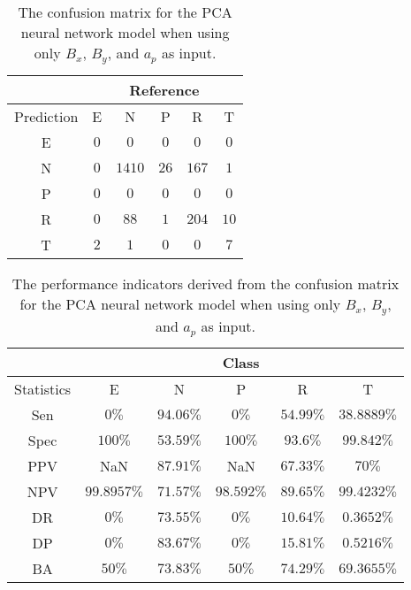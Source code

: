 \begin{table}[!ht]
	\centering
	\begin{tabular}{|c|c|c|c|c|c|}
		\hline
		 & \multicolumn{5}{|c|}{Reference} \\ \hline
		 Prediction & E & N & P & R & T \\ \hline
		 E & $0$ & $0$ & $0$ & $0$ & $0$ \\ \hline
		 N & $0$ & $1410$ & $26$ & $167$ & $1$ \\ \hline
		 P & $0$ & $0$ & $0$ & $0$ & $0$ \\ \hline
		 R & $0$ & $88$ & $1$ & $204$ & $10$ \\ \hline
		 T & $2$ & $1$ & $0$ & $0$ & $7$ \\ \hline
	\end{tabular}
	\caption{The confusion matrix for the PCA neural network model when using only $B_{x}$, $B_{y}$, and $a_{p}$ as input.}
	\label{tab:cm:xyap:pcaNNet}
\end{table}

\begin{table}[!ht]
	\centering
	\begin{tabular}{|c|c|c|c|c|c|}
		\hline
		 & \multicolumn{5}{c|}{Class} \\ \hline
		Statistics & E & N & P & R & T \\ \hline
		Sen & $0\%$ & $94.06\%$ & $0\%$ & $54.99\%$ & $38.8889\%$ \\ \hline
		Spec & $100\%$ & $53.59\%$ & $100\%$ & $93.6\%$ & $99.842\%$ \\ \hline
		PPV & NaN & $87.91\%$ & NaN & $67.33\%$ & $70\%$ \\ \hline
		NPV & $99.8957\%$ & $71.57\%$ & $98.592\%$ & $89.65\%$ & $99.4232\%$ \\ \hline
		DR & $0\%$ & $73.55\%$ & $0\%$ & $10.64\%$ & $0.3652\%$ \\ \hline
		DP & $0\%$ & $83.67\%$ & $0\%$ & $15.81\%$ & $0.5216\%$ \\ \hline
		BA & $50\%$ & $73.83\%$ & $50\%$ & $74.29\%$ & $69.3655\%$ \\ \hline
	\end{tabular}
	\caption{The performance indicators derived from the confusion matrix for the PCA neural network model when using only $B_{x}$, $B_{y}$, and $a_{p}$ as input.}
	\label{tab:cs:reverse:xyap:pcaNNet}
\end{table}

